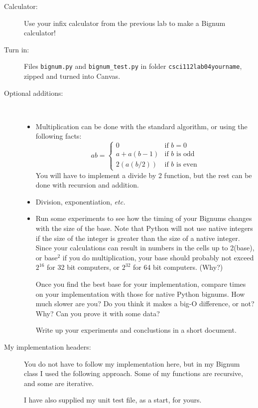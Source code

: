 \documentclass{article}
\begin{document}
\begin{description}
\item[Calculator:] Use your infix calculator from the previous lab to
make a Bignum calculator!

\item[Turn in:] Files {\tt bignum.py} and {\tt bignum\_test.py} in folder
{\tt csci112lab04yourname}, zipped and turned into Canvas.

\item[Optional additions:] ~

\begin{itemize}
\item
Multiplication can be done with the standard algorithm, or using the following facts:
\[
ab = 
\left\{\begin{array}{ll}
0 & \mbox{if $b=0$} \\
a+a(b-1) & \mbox{if $b$ is odd} \\
2(a(b/2)) & \mbox{if $b$ is even}
\end{array}\right.
\]
You will have to implement a divide by 2 function, but the rest can be done
with recursion and addition.

\item Division, exponentiation, {\em etc.}

\item Run some experiments to see how the timing of your
Bignums changes with the size of the base.  Note that Python will
not use native integers if the size of the integer is greater 
than the size of a native integer.  Since your calculations can result
in numbers in the cells up to 2(base), or base$^2$ if you do multiplication, 
your base should probably
not exceed $2^{16}$ for 32 bit computers, or $2^{32}$ for 64 bit
computers.  (Why?)

Once you find the best base for your implementation, compare
times on your implementation with those for native Python bignums.
How much slower are you?  Do you think it makes a big-O difference,
or not?  Why?  Can you prove it with some data?

Write up your experiments and conclustions in a short document.

    
\end{itemize}

\newpage
\item[My implementation headers:]   
You do not have to follow my implementation here, 
but in my Bignum class 
I used the following approach.  Some of my functions are recursive,
and some are iterative.

I have also supplied my unit test file, as a start, for yours.


\end{description}
\end{document}
